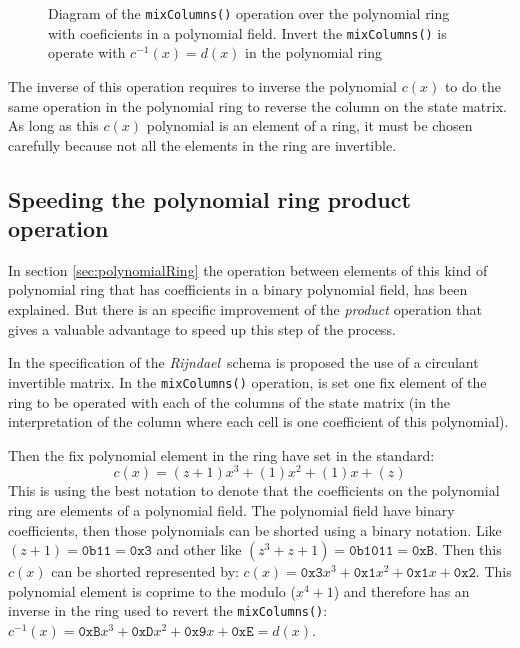 \documentclass[10pt,a4paper,twoside]{llncs}
\newcommand{\rijndael}{\emph{Rijndael}}
\begin{document}

\begin{figure}[ht]
\begin{center}

\caption{Diagram of the {\tt mixColumns()} operation over the polynomial ring with coeficients in a polynomial field. Invert the {\tt mixColumns()} is operate with $c^{-1}(x)=d(x)$ in the polynomial ring}
\label{fig:mixColumns}
\end{center}
\end{figure}

The inverse of this operation requires to inverse the polynomial $c(x)$ to do the same operation in the polynomial ring to reverse the column on the state matrix. As long as this $c(x)$ polynomial is an element of a ring, it must be chosen carefully because not all the elements in the ring are invertible.

\subsection{Speeding the polynomial ring product operation}\label{sec:improvePolynomialRingProduct}
In section \ref{sec:polynomialRing} the operation between elements of this kind of polynomial ring that has coefficients in a binary polynomial field, has been explained. But there is an specific improvement of the \emph{product} operation that gives a valuable advantage to speed up this step of the process. 

In the specification of the \rijndael\, schema \cite{Daemen01aes-ammended} is proposed the use of a circulant invertible matrix. In the {\tt mixColumns()} operation, is set one fix element of the ring to be operated with each of the columns of the state matrix (in the interpretation of the column where each cell is one coefficient of this polynomial).

Then the fix polynomial element in the ring have set in the standard:
$$c(x) = (z+1)x^3+(1)x^2+(1)x+(z)$$
This is using the best notation to denote that the coefficients on the polynomial ring are elements of a polynomial field. The polynomial field have binary coefficients, then those polynomials can be shorted using a binary notation. Like $(z+1)=\texttt{0b11}=\texttt{0x3}$ and other like $(z^3+z+1)=\texttt{0b1011}=\texttt{0xB}$. Then this $c(x)$ can be shorted represented by: $c(x) = \texttt{0x3}x^3+\texttt{0x1}x^2+\texttt{0x1}x+\texttt{0x2}$. This polynomial element is coprime to the modulo ($x^4+1$) and therefore has an inverse in the ring used to revert the {\tt mixColumns()}: $c^{-1}(x) = \texttt{0xB}x^3+\texttt{0xD}x^2+\texttt{0x9}x+\texttt{0xE}=d(x)$.
\end{document}
